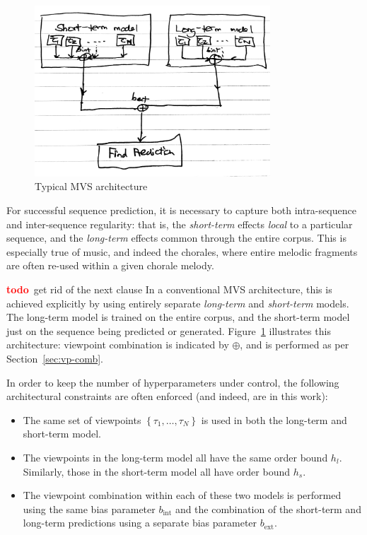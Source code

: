 \documentclass[12pt,a4paper,twoside,openright]{report}
\newcommand{\set}[1]{ \left\{ #1 \right\} }
\newcommand{\todo}{\textcolor{red}{\textbf{todo}~}}
\begin{document}
\begin{figure}[H]
\centering
\includegraphics[width=250pt]{figs/mvs_arch_tmp.jpg}
\caption{Typical MVS architecture}
\label{fig:mvs-arch}
\end{figure}

For successful sequence prediction, it is necessary to capture both
intra-sequence and inter-sequence regularity: that is, the \emph{short-term}
effects \emph{local} to a particular sequence, and the \emph{long-term} effects
common through the entire corpus.  This is especially true of music, and indeed
the chorales, where entire melodic fragments are often re-used within a given
chorale melody.

\todo get rid of the next clause
In a conventional MVS architecture, this is achieved explicitly by using
entirely separate \emph{long-term} and \emph{short-term} models. The long-term
model is trained on the entire corpus, and the short-term model just on the
sequence being predicted or generated. Figure~\ref{fig:mvs-arch} illustrates
this architecture: viewpoint combination is indicated by $\oplus$, and is
performed as per Section~\ref{sec:vp-comb}.

In order to keep the number of hyperparameters under control, the following
architectural constraints are often enforced (and indeed, are in this work):
\begin{itemize}
  \item The same set of viewpoints $\set{\tau_1, \ldots, \tau_N}$ is used in both
    the long-term and short-term model. 
  \item The viewpoints in the long-term model all have the same order bound
    $h_l$. Similarly, those in the short-term model all have order bound $h_s$.
  \item The viewpoint combination within each of these two models is performed
    using the same bias parameter $b_{\mathrm{int}}$ and the combination of the
    short-term and long-term predictions using a separate bias parameter
    $b_{\mathrm{ext}}$.
\end{itemize}
\end{document}
